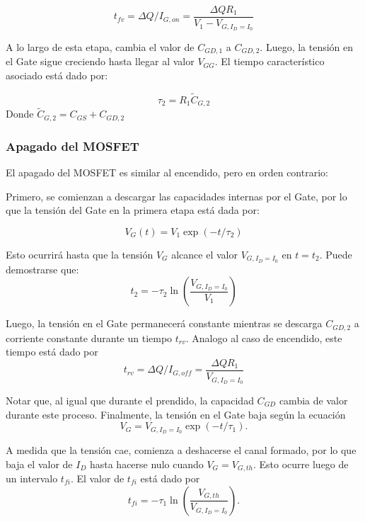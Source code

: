 \documentclass[e4_tp1_main.tex]{subfiles}
\begin{document}
\begin{equation}
t_{fv} = \Delta Q/I_{G,on} = \frac{\Delta Q R_1}{V_{1}-V_{G,I_D=I_0}}
\end{equation}

A lo largo de esta etapa, cambia el valor de $C_{GD,1}$ a $C_{GD,2}$. Luego, la tensión en el Gate sigue creciendo hasta llegar al valor $V_{GG}$. El tiempo característico asociado está dado por:

\begin{equation}
\tau_2 = R_1\tilde{C}_{G,2}
\end{equation}
Donde $\tilde{C}_{G,2} = C_{GS} + C_{GD,2}$

\subsubsection{Apagado del MOSFET}

El apagado del MOSFET es similar al encendido, pero en orden contrario:

Primero, se comienzan a descargar las capacidades internas por el Gate, por lo que la tensión del Gate en la primera etapa está dada por:

\begin{equation}
V_G(t) = V_{1} \exp(-t/\tau_2)
\end{equation}

Esto ocurrirá hasta que la tensión $V_G$ alcance el valor $V_{G,I_D=I_0}$ en $t=t_2$. Puede demostrarse que:
\begin{equation}
t_2= -\tau_2\ln\left(\frac{V_{G,I_D=I_0}}{V_1}\right)
\end{equation}

Luego, la tensión en el Gate permanecerá constante mientras se descarga $C_{GD,2}$ a corriente constante durante un tiempo $t_{rv}$. Analogo al caso de encendido, este tiempo está dado por
\begin{equation}
t_{rv} = \Delta Q/I_{G,off} = \frac{\Delta Q R_1}{V_{G,I_D=I_0}}
\end{equation}

Notar que, al igual que durante el prendido, la capacidad $C_{GD}$ cambia de valor durante este proceso. Finalmente, la tensión en el Gate baja según la ecuación
\begin{equation}
V_{G} = V_{G,I_D=I_0}\exp(-t/\tau_1).
\end{equation}

A medida que la tensión cae, comienza a deshacerse el canal formado, por lo que baja el valor de $I_D$ hasta hacerse nulo cuando $V_G=V_{G,th}$. Esto ocurre luego de un intervalo $t_{fi}$. El valor de $t_{fi}$ está dado por
\begin{equation}
t_{fi}= -\tau_1\ln\left(\frac{V_{G,th}}{V_{G,I_D=I_0}}\right).
\end{equation}
\end{document}
